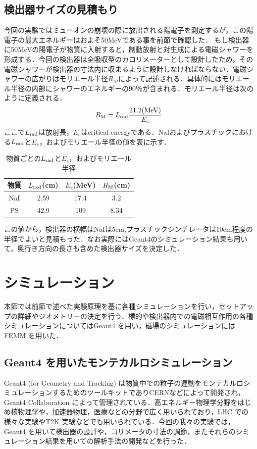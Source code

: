 \subsection{検出器サイズの見積もり}
今回の実験ではミューオンの崩壊の際に放出される陽電子を測定するが，この陽電子の最大エネルギーはおよそ50MeVである事を前節で確認した．
もし検出器に50MeVの陽電子が物質に入射すると，制動放射と対生成による電磁シャワーを形成する．今回の検出器は全吸収型のカロリメーターとして設計したため，その電磁シャワーが検出器の寸法内に収まるように設計しなければならない．電磁シャワーの広がりはモリエール半径$R_M$によって記述される．具体的にはモリエール半径の内部にシャワーのエネルギーの90％が含まれる．モリエール半径は次のように定義される．
\begin{equation}
R_{\rm M} = L_{\rm rad}\frac{21.2{\rm (MeV)}}{E_c}
\end{equation}
ここで$L_{\rm rad}$は放射長，$E_c$はcritical energyである．NaIおよびプラスチックにおける$L_{\rm rad}$と$E_c$，およびモリエール半径の値を表に示す．
\begin{table}[b]
\centering
  \begin{tabular}{cccc}
    物質 & $L_{\rm rad}$(cm) & $E_c$(MeV) & $R_{\rm M}$(cm) \\\hline \hline
    NaI & 2.59 & 17.4 & 3.2 \\
    PS & 42.9 & 109 & 8.34 \\
  \end{tabular}
  \caption{物質ごとの$L_{\rm rad}$と$E_c$，およびモリエール半径}
\end{table}
この値から，検出器の横幅はNaIは5cm,プラスチックシンチレータは10cm程度の半径でよいと見積もった．なお実際にはGeant4のシミュレーション結果も用いて，奥行き方向の長さも含めた検出器サイズを決定した．
\newpage

\section{シミュレーション}
	本節では前節で述べた実験原理を基に各種シミュレーションを行い，セットアップの詳細やジオメトリーの決定を行う．標的や検出器内での電磁相互作用の各種シミュレーションについてはGeant4 を用い，磁場のシミュレーションにはFEMM を用いた．
	
	\subsection{Geant4 を用いたモンテカルロシミュレーション}
	Geant4 (for Geometry and Tracking) は物質中での粒子の運動をモンテカルロシミュレーションするためのツールキットでありCERNなどによって開発され，Geant4 Collaboration によって管理されている．高エネルギー物理学分野をはじめ核物理学や，加速器物理，医療などの分野で広く用いられており，LHC での様々な実験やT2K 実験などでも用いられている．今回の我々の実験では，Geant4 を用いて検出器の設計や，コリメータの寸法の調節，またそれらのシミュレーション結果を用いての解析手法の開発などを行った．%
